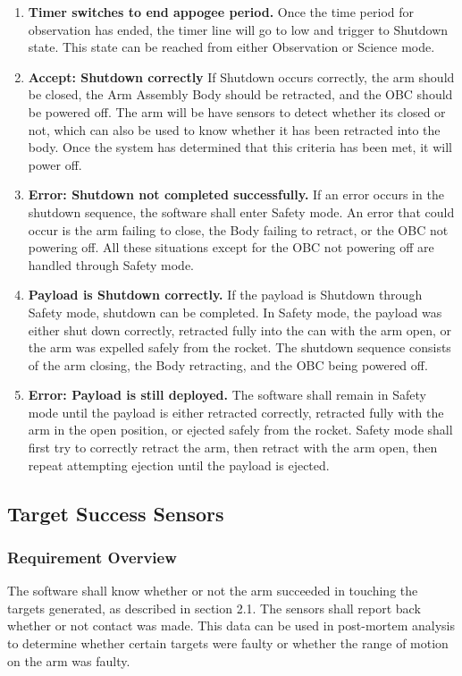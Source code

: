\documentclass[letterpaper,10pt]{article}
\begin{document}
\begin{center}
\begin{enumerate}
{notified via an interrupt.}
\item{\textbf{Timer switches to end appogee period.} Once the time period for observation has ended, the timer line will go to low and trigger to Shutdown state. This state can be reached from either Observation or Science mode.}
\item{\textbf{Accept: Shutdown correctly} If Shutdown occurs correctly, the arm should be closed, the Arm Assembly Body should be retracted, and the \gls{OBC} should be powered off. The arm will be have sensors to detect whether its closed or not, which can also
be used to know whether it has been retracted into the body. Once the system has determined that this criteria has been met, it
will power off.}
\item{\textbf{Error: Shutdown not completed successfully.} If an error occurs in the shutdown sequence, the software shall enter Safety mode. An error that could occur is the arm failing to close, the Body failing to retract, or the \gls{OBC} not powering off. All 
these situations except for the \gls{OBC} not powering off are handled through Safety mode.}
\item{\textbf{Payload is Shutdown correctly.} If the payload is Shutdown through Safety mode, shutdown can be completed. In Safety mode, the payload was either shut down correctly, retracted fully into the can with the arm open, or the arm was expelled safely from the rocket. The shutdown sequence consists of the arm closing, the Body retracting, and the \gls{OBC} being powered off.}
\item{\textbf{Error: Payload is still deployed.} The software shall remain in Safety mode until the payload is either retracted correctly, retracted fully with the arm in the open position, or ejected safely from the rocket. Safety mode shall first try to correctly retract the arm, then retract with the arm open, then repeat attempting ejection until the payload is ejected.}
\end{enumerate}
\end{center}

\subsection{Target Success Sensors}
\label{subsec:tests}
\subsubsection{Requirement Overview}
The software shall know whether or not the arm succeeded in touching the targets generated, as described in section 2.1. The sensors
shall report back whether or not contact was made. This data can be used in post-mortem analysis to determine whether
certain targets were faulty or whether the range of motion on the arm was faulty.
\end{document}
